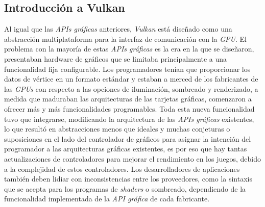 \documentclass[a4paper]{book}
\begin{document}
\subsection{Introducción a Vulkan}
\label{subsec:IntroVulkan}

Al igual que las \textit{APIs gráficas} anteriores, \textit{Vulkan} está diseñado como una abstracción multiplataforma
para la interfaz de comunicación con la \textit{GPU}. El problema con la mayoría de estas \textit{APIs gráficas} es la era en la que se diseñaron, 
presentaban hardware de gráficos que se limitaba principalmente a una funcionalidad fija configurable. Los programadores tenían que
proporcionar los datos de vértice en un formato estándar y estaban a merced de los fabricantes de las \textit{GPUs} con respecto
a las opciones de iluminación, sombreado y renderizado, a medida que maduraban las arquitecturas de las tarjetas gráficas,
comenzaron a ofrecer más y más funcionalidades programables. Toda esta nueva funcionalidad tuvo que integrarse, modificando la arquitectura
de las \textit{APIs gráficas} existentes, lo que resultó en abstracciones menos que ideales y muchas conjeturas o suposiciones en el lado del
controlador de gráficos para asignar la intención del programador a las arquitecturas gráficas existentes, es por eso que hay tantas actualizaciones
de controladores para mejorar el rendimiento en los juegos, debido a la complejidad de estos controladores. Los desarrolladores de aplicaciones
también deben lidiar con inconsistencias entre los proveedores, como la sintaxis que se acepta para los programas de \textit{shaders} o sombreado, 
dependiendo de la funcionalidad implementada de la \textit{API gráfica} de cada fabricante.
\end{document}
